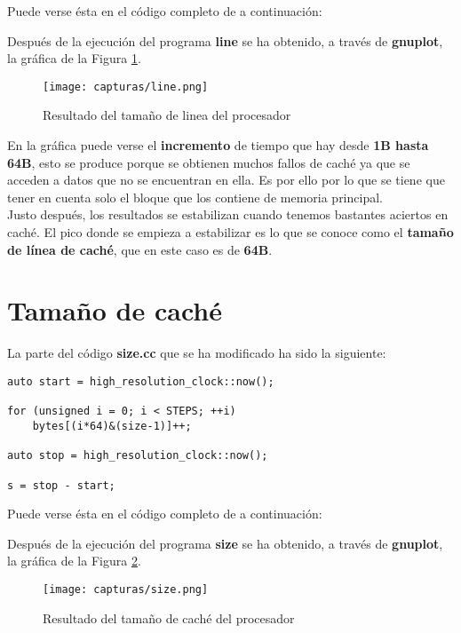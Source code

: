 Puede verse ésta en el código completo de a continuación:



Después de la ejecución del programa \textbf{line} se ha obtenido, a través de \textbf{gnuplot}, la gráfica de la Figura \ref{fig:figura5}.
	\begin{figure}[H] %
		\centering
		\texttt{[image: capturas/line.png]} 
		\caption{Resultado del tamaño de linea del procesador} 
		\label{fig:figura5}
	\end{figure}

En la gráfica puede verse el \textbf{incremento} de tiempo que hay desde \textbf{1B
hasta 64B}, esto se produce porque se obtienen muchos fallos de caché ya que se acceden a datos que no se encuentran en ella. Es por ello por lo que se tiene que tener en cuenta solo el bloque que los contiene de memoria principal. 
\\

Justo
después, los resultados se estabilizan cuando tenemos bastantes aciertos en caché. El pico donde se empieza a estabilizar es lo que se conoce como el \textbf{tamaño de línea de caché}, que en este caso es de \textbf{64B}.

\section{Tamaño de caché}

La parte del código \textbf{size.cc} que se ha modificado ha sido la siguiente:

\begin{lstlisting}
auto start = high_resolution_clock::now();

for (unsigned i = 0; i < STEPS; ++i)
	bytes[(i*64)&(size-1)]++;

auto stop = high_resolution_clock::now();

s = stop - start;
\end{lstlisting}

Puede verse ésta en el código completo de a continuación:



Después de la ejecución del programa \textbf{size} se ha obtenido, a través de \textbf{gnuplot}, la gráfica de la Figura \ref{fig:figura6}.
\begin{figure}[H] %
	\centering
	\texttt{[image: capturas/size.png]} 
	\caption{Resultado del tamaño de caché del procesador} 
	\label{fig:figura6}
\end{figure}

